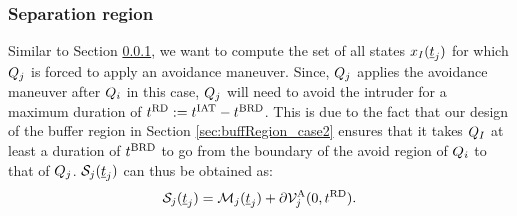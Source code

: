 \subsubsection{Separation region} \label{sec:sepRegion_case2}
Similar to Section \ref{sec:sepRegion_case2}, we want to compute the set of all states $x_{I}(\underline{t}_j)$ for which $Q_j$ is forced to apply an avoidance maneuver. Since, $Q_j$ applies the avoidance maneuver after $Q_i$ in this case, $Q_j$ will need to avoid the intruder for a maximum duration of $t^\text{RD} := t^\text{IAT} - t^\text{BRD}$. This is due to the fact that our design of the buffer region in Section \ref{sec:buffRegion_case2} ensures that it takes $Q_{I}$ at least a duration of $t^\text{BRD}$ to go from the boundary of the avoid region of $Q_i$ to that of $Q_j$. $\mathcal{S}_j(\underline{t}_j)$ can thus be obtained as:
\begin{equation} \label{eqn:sepRegion_case2}
\sep_j(\tsa_j) = \boset_j(\tsa_j) + \partial \brs^{\text{A}}_{j}(0, \trd).
\end{equation}

